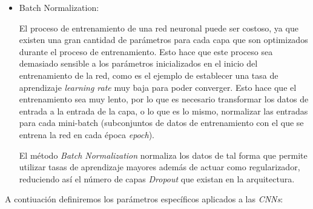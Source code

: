 \begin{itemize}
                \item Batch Normalization:

                    El proceso de entrenamiento de una red neuronal puede ser costoso, ya que existen una gran cantidad de parámetros para cada capa que son optimizados durante el proceso de entrenamiento. Esto hace que este proceso sea demasiado sensible a los parámetros inicializados en el inicio del entrenamiento de la red, como es el ejemplo de establecer una tasa de aprendizaje \textit{learning rate} muy baja para poder converger. Esto hace que el entrenamiento sea muy lento, por lo que es necesario transformar los datos de entrada a la entrada de la capa, o lo que es lo mismo, normalizar las entradas para cada mini-batch (subconjuntos de datos de entrenamiento con el que se entrena la red en cada época \textit{epoch}).


                    El método \textit{Batch Normalization} \cite{BatchNormalization} normaliza los datos de tal forma que permite utilizar tasas de aprendizaje mayores además de actuar como regularizador, reduciendo así el número de capas \textit{Dropout} que existan en la arquitectura.

            \end{itemize}


            A contiuación definiremos los parámetros específicos aplicados a las \textit{CNNs}:

